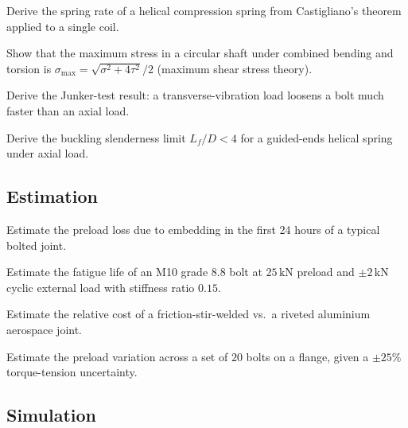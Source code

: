 \begin{exercise}
Derive the spring rate of a helical compression spring from Castigliano's theorem applied to a single coil.
\end{exercise}

\begin{exercise}
Show that the maximum stress in a circular shaft under combined bending and torsion is $\sigma_{\max} = \sqrt{\sigma^2 + 4\tau^2} / 2$ (maximum shear stress theory).
\end{exercise}

\begin{exercise}
Derive the Junker-test result: a transverse-vibration load loosens a bolt much faster than an axial load.
\end{exercise}

\begin{exercise}
Derive the buckling slenderness limit $L_f/D < 4$ for a guided-ends helical spring under axial load.
\end{exercise}

\subsection*{Estimation}

\begin{exercise}
Estimate the preload loss due to embedding in the first 24 hours of a typical bolted joint.
\end{exercise}

\begin{exercise}
Estimate the fatigue life of an M10 grade 8.8 bolt at $25\,\si{\kilo\newton}$ preload and $\pm 2\,\si{\kilo\newton}$ cyclic external load with stiffness ratio $0.15$.
\end{exercise}

\begin{exercise}
Estimate the relative cost of a friction-stir-welded vs.\ a riveted aluminium aerospace joint.
\end{exercise}

\begin{exercise}
Estimate the preload variation across a set of $20$ bolts on a flange, given a $\pm 25\%$ torque-tension uncertainty.
\end{exercise}

\subsection*{Simulation}

